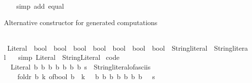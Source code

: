 \begin{isabellebody}
%
\isadelimproof
\ \ %
\endisadelimproof
%
\isatagproof
{}\isamarkupfalse%
\ {\isacharparenleft}{\kern0pt}simp\ add{\isacharcolon}{\kern0pt}\ equal{\isacharparenright}{\kern0pt}%
\endisatagproof
{\isafoldproof}%
%
\isadelimproof
\isanewline
%
\endisadelimproof
\isanewline
{}\isamarkupfalse%
%
\isadelimdocument
%
\endisadelimdocument
%
\isatagdocument
%
\isamarkuptrue%
%
\endisatagdocument
{\isafolddocument}%
%
\isadelimdocument
%
\endisadelimdocument
%
\begin{isamarkuptext}%
Alternative constructor for generated computations%
\end{isamarkuptext}\isamarkuptrue%
\isamarkupfalse%
\isanewline
{}\isanewline
\isanewline
{}\ \isamarkupfalse%
\ Literal{\isacharprime}{\kern0pt}\ {\isacharcolon}{\kern0pt}{\isacharcolon}{\kern0pt}\ {\isachardoublequoteopen}bool\ {\isasymRightarrow}\ bool\ {\isasymRightarrow}\ bool\ {\isasymRightarrow}\ bool\ {\isasymRightarrow}\ bool\ {\isasymRightarrow}\ bool\ {\isasymRightarrow}\ bool\ {\isasymRightarrow}\ String{\isachardot}{\kern0pt}literal\ {\isasymRightarrow}\ String{\isachardot}{\kern0pt}literal{\isachardoublequoteclose}\isanewline
\ \ \ {\isacharbrackleft}{\kern0pt}simp{\isacharbrackright}{\kern0pt}{\isacharcolon}{\kern0pt}\ {\isachardoublequoteopen}Literal{\isacharprime}{\kern0pt}\ {\isacharequal}{\kern0pt}\ String{\isachardot}{\kern0pt}Literal{\isachardoublequoteclose}\isanewline
\isanewline
{}\isamarkupfalse%
\ {\isacharbrackleft}{\kern0pt}code{\isacharbrackright}{\kern0pt}{\isacharcolon}{\kern0pt}\isanewline
\ \ {\isacartoucheopen}Literal{\isacharprime}{\kern0pt}\ b{}\ b{}\ b{}\ b{}\ b{}\ b{}\ b{}\ s\ {\isacharequal}{\kern0pt}\ String{\isachardot}{\kern0pt}literal{\isacharunderscore}{\kern0pt}of{\isacharunderscore}{\kern0pt}asciis\isanewline
\ \ \ \ {\isacharbrackleft}{\kern0pt}foldr\ {\isacharparenleft}{\kern0pt}{\isasymlambda}b\ k{\isachardot}{\kern0pt}\ of{\isacharunderscore}{\kern0pt}bool\ b\ {\isacharplus}{\kern0pt}\ k\ {\isacharasterisk}{\kern0pt}\ {}{\isacharparenright}{\kern0pt}\ {\isacharbrackleft}{\kern0pt}b{}{\isacharcomma}{\kern0pt}\ b{}{\isacharcomma}{\kern0pt}\ b{}{\isacharcomma}{\kern0pt}\ b{}{\isacharcomma}{\kern0pt}\ b{}{\isacharcomma}{\kern0pt}\ b{}{\isacharcomma}{\kern0pt}\ b{}{\isacharbrackright}{\kern0pt}\ {}{\isacharbrackright}{\kern0pt}\ {\isacharplus}{\kern0pt}\ s{\isacartoucheclose}\isanewline

\end{isabellebody}
